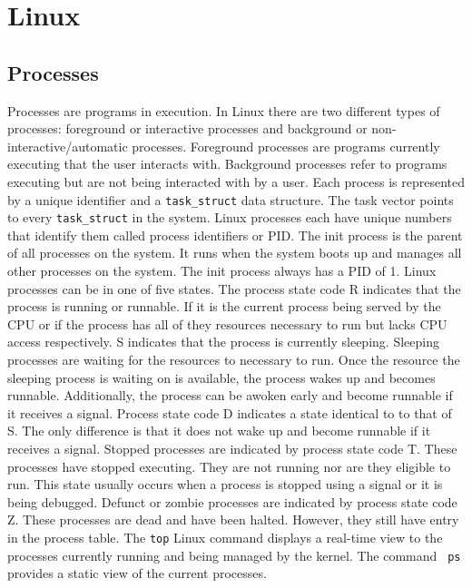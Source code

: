 \section{Linux}
\subsection{Processes}
\noindent
Processes are programs in execution. In Linux there are two different types of processes: foreground or interactive processes and background or non-interactive/automatic processes. Foreground processes are programs currently executing that the user interacts with. Background processes refer to programs executing but are not being interacted with by a user. 
\newline
\newline
\noindent
Each process is represented by a unique identifier and a \lstinline{task_struct} data structure. The task vector points to every \lstinline{task_struct} in the system. Linux processes each have unique numbers that identify them called process identifiers or PID. The init process is the parent of all processes on the system. It runs when the system boots up and manages all other processes on the system. The init process always has a PID of 1. 
\newline
\newline
\noindent
Linux processes can be in one of five states. The process state code R indicates that the process is running or runnable. If it is the current  process being served by the CPU or if the process has all of they resources necessary to run but lacks CPU access respectively. S indicates that the process is currently sleeping. Sleeping processes are waiting for the resources to necessary to run. Once the resource the sleeping process is waiting on is available, the process wakes up and becomes runnable. Additionally, the process can be awoken early and become runnable if it receives a signal. Process state code D indicates a state identical to to that of S. The only difference is that it does not wake up and become runnable if it receives a signal. Stopped processes are indicated by process state code T. These processes have stopped executing. They are not running nor are they eligible to run. This state usually occurs when a process is stopped using a signal or it is being debugged. Defunct or zombie processes are indicated by process state code Z. These processes are dead and have been halted. However, they still have entry in the process table. 
\newline
\newline
\noindent
The \lstinline{top} Linux command displays a real-time view to the processes currently running and being  managed by the kernel. The command \lstinline{ ps} provides a static view of the current processes.   


